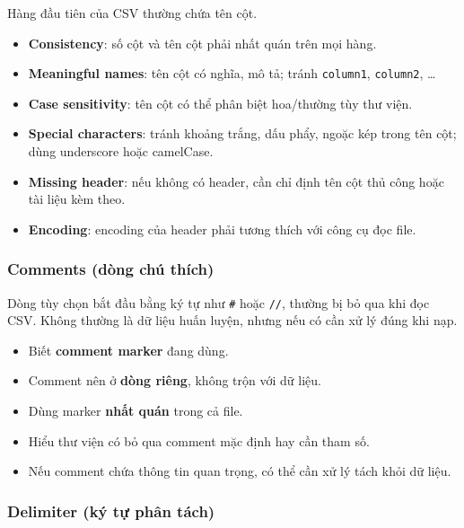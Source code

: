 \begin{phuongphap}[title={Vai trò và lưu ý}]
Hàng đầu tiên của CSV thường chứa tên cột.
\begin{itemize}
  \item \textbf{Consistency}: số cột và tên cột phải nhất quán trên mọi hàng.
  \item \textbf{Meaningful names}: tên cột có nghĩa, mô tả; tránh \texttt{column1}, \texttt{column2}, \ldots
  \item \textbf{Case sensitivity}: tên cột có thể phân biệt hoa/thường tùy thư viện.
  \item \textbf{Special characters}: tránh khoảng trắng, dấu phẩy, ngoặc kép trong tên cột; dùng underscore hoặc camelCase.
  \item \textbf{Missing header}: nếu không có header, cần chỉ định tên cột thủ công hoặc tài liệu kèm theo.
  \item \textbf{Encoding}: encoding của header phải tương thích với công cụ đọc file.
\end{itemize}
\end{phuongphap}

\subsubsection{Comments (dòng chú thích)}

\begin{ynghia}[title={Dòng comment}]
Dòng tùy chọn bắt đầu bằng ký tự như \texttt{\#} hoặc \texttt{//}, thường bị bỏ qua khi đọc CSV.
Không thường là dữ liệu huấn luyện, nhưng nếu có cần xử lý đúng khi nạp.
\end{ynghia}

\begin{phuongphap}[title={Lưu ý khi xử lý comment}]
\begin{itemize}
  \item Biết \textbf{comment marker} đang dùng.
  \item Comment nên ở \textbf{dòng riêng}, không trộn với dữ liệu.
  \item Dùng marker \textbf{nhất quán} trong cả file.
  \item Hiểu thư viện có bỏ qua comment mặc định hay cần tham số.
  \item Nếu comment chứa thông tin quan trọng, có thể cần xử lý tách khỏi dữ liệu.
\end{itemize}
\end{phuongphap}

\subsubsection{Delimiter (ký tự phân tách)}

